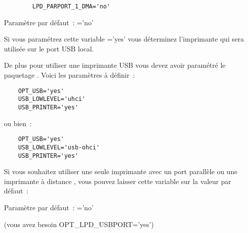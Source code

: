 \begin{description}
{\begin{example}
\begin{verbatim}
        LPD_PARPORT_1_DMA='no'
\end{verbatim}
\end{example}

        Paramètre par défaut~: ='no'}



    Si vous paramétrez cette variable ='yes' vous
    déterminez l'imprimante qui sera utilisée sur le port USB local.

    De plus pour utiliser une imprimante USB vous devez avoir paramétré le
    paquetage . Voici les paramètres à définir~:

\begin{example}
\begin{verbatim}
    OPT_USB='yes'
    USB_LOWLEVEL='uhci'
    USB_PRINTER='yes'
\end{verbatim}
\end{example}

        ou bien~:

\begin{example}
\begin{verbatim}
    OPT_USB='yes'
    USB_LOWLEVEL='usb-ohci'
    USB_PRINTER='yes'
\end{verbatim}
\end{example}


    Si vous souhaitez utiliser une seule imprimante avec un port parallèle
    ou une imprimante à distance , vous pouvez laisser cette variable sur
    la valeur par défaut~:

    Paramètre par défaut~: ='no'


 (vous avez besoin OPT\_LPD\_USBPORT='yes')


\end{description}

